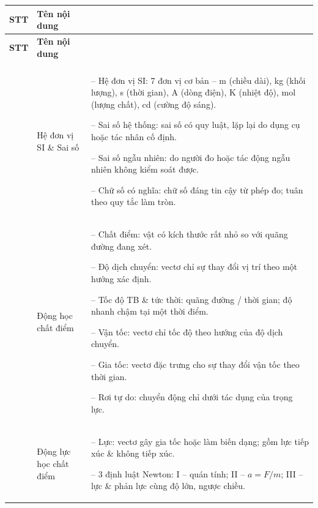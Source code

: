 \documentclass[12pt,a4paper,twoside]{article}
\begin{document}
\renewcommand{\arraystretch}{1.35}
{\small{}
\begin{longtable}{|>{\centering\arraybackslash}m{0.8cm}|>{\centering\arraybackslash}m{3cm}|>{\raggedright\arraybackslash}m{11.5cm}|}
\hline
\rowcolor{primaryBlue!15}
\textbf{STT} & \textbf{Tên nội dung} & \multicolumn{1}{c|}{\cellcolor{primaryBlue!15}\textbf{Các khái niệm cơ bản}} \\
\hline
\endfirsthead
\hline
\rowcolor{primaryBlue!15}
\textbf{STT} & \textbf{Tên nội dung} & \multicolumn{1}{c|}{\cellcolor{primaryBlue!15}\textbf{Các khái niệm cơ bản}} \\
\hline
\endhead
\hline
\endfoot
\hline
\endlastfoot

\multicolumn{3}{|c|}{\cellcolor{accentBlue!12}\textcolor{accentBlue}{\textbf{\large I. CƠ SỞ KHOA HỌC VỀ VẬT LÝ}}} \\
\hline
1 & Hệ đơn vị SI \& Sai số &
-- Hệ đơn vị SI: 7 đơn vị cơ bản -- m (chiều dài), kg (khối lượng), s (thời gian), A (dòng điện), K (nhiệt độ), mol (lượng chất), cd (cường độ sáng).

-- Sai số hệ thống: sai số có quy luật, lặp lại do dụng cụ hoặc tác nhân cố định.

-- Sai số ngẫu nhiên: do người đo hoặc tác động ngẫu nhiên không kiểm soát được.

-- Chữ số có nghĩa: chữ số đáng tin cậy từ phép đo; tuân theo quy tắc làm tròn. \\
\hline
2 & Động học chất điểm &
-- Chất điểm: vật có kích thước rất nhỏ so với quãng đường đang xét.

-- Độ dịch chuyển: vectơ chỉ sự thay đổi vị trí theo một hướng xác định.

-- Tốc độ TB \& tức thời: quãng đường / thời gian; độ nhanh chậm tại một thời điểm.

-- Vận tốc: vectơ chỉ tốc độ theo hướng của độ dịch chuyển.

-- Gia tốc: vectơ đặc trưng cho sự thay đổi vận tốc theo thời gian.

-- Rơi tự do: chuyển động chỉ dưới tác dụng của trọng lực. \\
\hline
3 & Động lực học chất điểm &
-- Lực: vectơ gây gia tốc hoặc làm biến dạng; gồm lực tiếp xúc \& không tiếp xúc.

-- 3 định luật Newton: I -- quán tính; II -- $a = F/m$; III -- lực \& phản lực cùng độ lớn, ngược chiều.


\end{longtable}}
\end{document}
